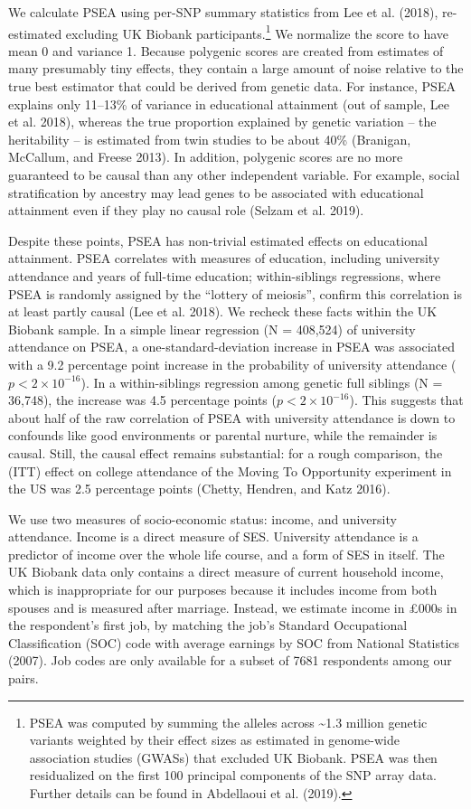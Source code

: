 \documentclass[
]{article}
\theoremstyle{definition}
\theoremstyle{definition}
\theoremstyle{definition}
\theoremstyle{definition}
\theoremstyle{remark}
\begin{document}
We calculate PSEA using per-SNP summary statistics from Lee et al. (2018),
re-estimated excluding UK Biobank participants.\footnote{PSEA was computed by summing the alleles across \textasciitilde1.3 million
  genetic variants weighted by their effect sizes as estimated in
  genome-wide association studies (GWASs) that excluded UK Biobank.
  PSEA was then residualized on the first 100 principal components of
  the SNP array data. Further details can be found in
  Abdellaoui et al. (2019).} We normalize the score to
have mean 0 and variance 1. Because polygenic scores are created from estimates
of many presumably tiny effects, they contain a large amount of noise relative
to the true best estimator that could be derived from genetic data. For
instance, PSEA explains only 11--13\% of variance in educational attainment (out
of sample, Lee et al. 2018), whereas the true proportion explained by genetic
variation -- the heritability -- is estimated from twin studies to be about 40\%
(Branigan, McCallum, and Freese 2013). In addition, polygenic scores are no more guaranteed
to be causal than any other independent variable. For example, social
stratification by ancestry may lead genes to be associated with educational
attainment even if they play no causal role (Selzam et al. 2019).

Despite these points, PSEA has non-trivial estimated effects on educational
attainment. PSEA correlates with measures of education, including university
attendance and years of full-time education; within-siblings regressions, where
PSEA is randomly assigned by the ``lottery of meiosis'', confirm this correlation
is at least partly causal (Lee et al. 2018). We recheck these facts within the UK
Biobank sample. In a simple linear regression (N = 408,524) of
university attendance on PSEA, a one-standard-deviation increase in PSEA was
associated with a 9.2 percentage point increase in the
probability of university attendance (\(p < 2 \times 10^{-16}\)). In a
within-siblings regression among genetic full siblings (N =
36,748), the increase was
4.5 percentage points (\(p < 2 \times 10^{-16}\)).
This suggests that about half of the raw correlation of PSEA with
university attendance is down to confounds like good environments or parental
nurture, while the remainder is causal. Still, the causal effect remains
substantial: for a rough comparison, the (ITT) effect on college attendance of
the Moving To Opportunity experiment in the US was 2.5 percentage points
(Chetty, Hendren, and Katz 2016).

We use two measures of socio-economic status: income, and university attendance.
Income is a direct measure of SES. University attendance is a predictor of
income over the whole life course, and a form of SES in itself. The UK Biobank
data only contains a direct measure of current household income, which is
inappropriate for our purposes because it includes income from both spouses and
is measured after marriage. Instead, we estimate income in £000s in the
respondent's first job, by matching the job's Standard Occupational
Classification (SOC) code with average earnings by SOC from National Statistics (2007). Job
codes are only available for a subset of 7681 respondents among
our pairs.
\end{document}
